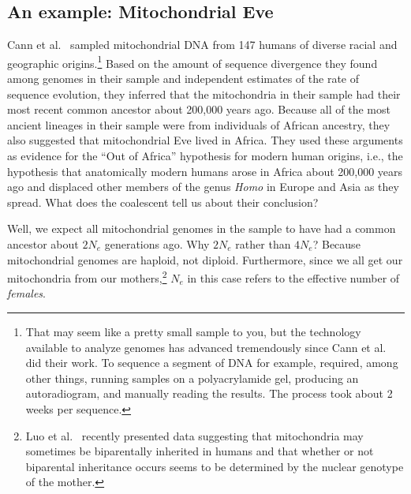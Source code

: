 \documentclass[12pt]{article}
\begin{document}
\subsection*{An example: Mitochondrial
  Eve}

Cann et al.~\cite{Cann-etal-1987} sampled mitochondrial DNA from 147
humans of diverse racial and geographic origins.\footnote{That may
  seem like a pretty small sample to you, but the technology
  available to analyze genomes has advanced tremendously since Cann et
  al. did their work. To sequence a segment of DNA for example,
  required, among other things, running samples on a polyacrylamide
  gel, producing an autoradiogram, and manually reading the
  results. The process took about 2 weeks per sequence.}  Based on the
amount of sequence divergence they found among genomes in their sample
and independent estimates of the rate of sequence evolution, they
inferred that the mitochondria in their sample had their most recent
common ancestor about 200,000 years ago. Because all of the most
ancient lineages in their sample were from individuals of African
ancestry, they also suggested that mitochondrial Eve lived in
Africa. They used these arguments as evidence for the ``Out of
Africa'' hypothesis for modern human origins, i.e., the hypothesis
that anatomically modern humans arose in Africa about 200,000 years
ago and displaced other members of the genus {\it Homo\/} in Europe
and Asia as they spread. What does the coalescent tell us about their
conclusion?

Well, we expect all mitochondrial genomes in the sample to have had a
common ancestor about $2N_e$ generations ago. Why $2N_e$ rather than
$4N_e$? Because mitochondrial genomes are haploid, not
diploid. Furthermore, since we all get our mitochondria from our
mothers,\footnote{Luo et al.~\cite{Luo-etal-2018} recently presented
  data suggesting that mitochondria may sometimes be biparentally
  inherited in humans and that whether or not biparental inheritance
  occurs seems to be determined by the nuclear genotype of the
  mother.} $N_e$ in this case refers to the effective number of {\it
  females}.
\end{document}
